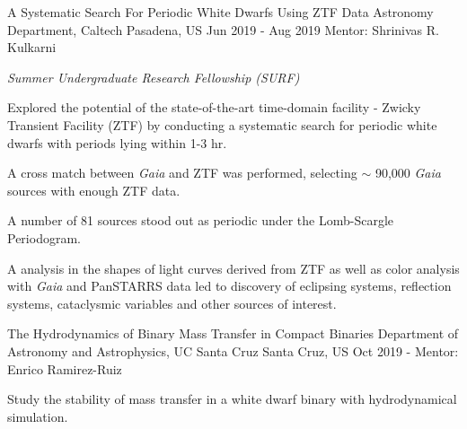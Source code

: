 \begin{cvexperiences}
\cvexperience
{A Systematic Search For Periodic White Dwarfs Using ZTF Data} %
{Astronomy Department, Caltech} %
{Pasadena, US} %
{Jun 2019 - Aug 2019} %
{Mentor: Shrinivas R. Kulkarni}
{ %
	\begin{cvitems}
		\item {\textit{Summer Undergraduate Research Fellowship (SURF)}}
		\item {Explored the potential of the state-of-the-art time-domain facility - Zwicky Transient Facility (ZTF) by conducting a systematic search for periodic white dwarfs with periods lying within 1-3 hr.}
		\item {A cross match between \textit{Gaia} and ZTF was performed, selecting $\sim$ 90,000 \textit{Gaia} sources with enough ZTF data.}
		\item {A number of 81 sources stood out as periodic under the Lomb-Scargle Periodogram. }
		\item {A analysis in the shapes of light curves derived from ZTF as well as color analysis with \textit{Gaia} and PanSTARRS data led to discovery of eclipsing systems, reflection systems, cataclysmic variables and other sources of interest.}
	\end{cvitems}
}

\cvexperience
{The Hydrodynamics of Binary Mass Transfer in Compact Binaries} %
{Department of Astronomy and Astrophysics, UC Santa Cruz} %
{Santa Cruz, US} %
{Oct 2019 -} %
{Mentor: Enrico Ramirez-Ruiz}
{ %
	\begin{cvitems}
		\item {Study the stability of mass transfer in a white dwarf binary with hydrodynamical simulation.}
	\end{cvitems}
}

\end{cvexperiences}